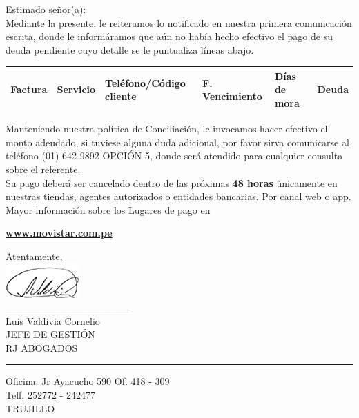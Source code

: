 \noindent
Estimado señor(a):\\
Mediante la presente, le reiteramos lo notificado en nuestra primera comunicación escrita, donde le informáramos que aún no había hecho efectivo el pago de su deuda pendiente cuyo detalle se le puntualiza líneas abajo.

\begin{center}
\scriptsize
\begin{tabular}{|x{1.2cm}|x{2cm}|x{3.5cm}|x{2.5cm}|x{2cm}|x{2cm}|}
\hline
\textbf{Factura} & \textbf{Servicio} & \textbf{Teléfono/Código cliente} & \textbf{F. Vencimiento} & \textbf{Días de mora} & \textbf{Deuda} \\
\hline
\hline
\end{tabular}
\end{center}

\noindent Manteniendo nuestra política de Conciliación, le invocamos hacer efectivo el monto adeudado,
si tuviese alguna duda adicional, por favor sirva comunicarse al teléfono (01) 642-9892 OPCIÓN 5,
donde será atendido para cualquier consulta sobre el referente.\\

\noindent Su pago deberá ser cancelado dentro de las próximas \textbf{48 horas} únicamente en nuestras tiendas, agentes autorizados o entidades bancarias. Por canal web o app. Mayor información sobre los Lugares de pago en
\begin{center}
\underline{\textcolor[rgb]{0.00,0.07,1.00}{\textbf{www.movistar.com.pe}}}
\end{center}

\noindent Atentamente,\\
\includegraphics[natwidth=2.831041667cm, natheight=1.322916667cm]{resources/lawyer_signature.png}\\
\_\_\_\_\_\_\_\_\_\_\_\_\_\_\_\_\_\\
{\small Luis Valdivia Cornelio\\
JEFE DE GESTIÓN\\
RJ ABOGADOS}\\


\textcolor[rgb]{1.00,0.00,0.00}{\hrule}
\vspace{0.2cm}
{\noindent\footnotesize Oficina: Jr Ayacucho 590 Of. 418 - 309\\
Telf. 252772 - 242477\\
TRUJILLO}








